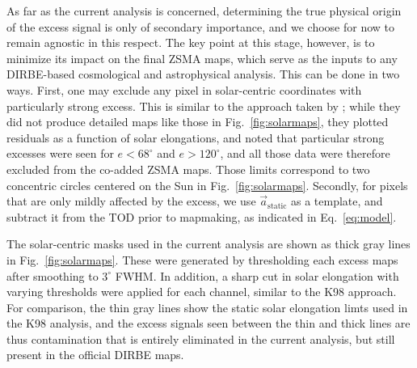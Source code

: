 \documentclass{aa}
\renewcommand{\a}[0]{\vec{a}}
\begin{document}
As far as the current analysis is concerned, determining the true
physical origin of the excess signal is only of secondary importance,
and we choose for now to remain agnostic in this respect. The key
point at this stage, however, is to minimize its impact on the final
ZSMA maps, which serve as the inputs to any DIRBE-based cosmological
and astrophysical analysis. This can be done in two ways. First, one
may exclude any pixel in solar-centric coordinates with particularly
strong excess. This is similar to the approach taken by
\citet{kelsall1998}; while they did not produce detailed maps like
those in Fig.~\ref{fig:solarmaps}, they plotted residuals as a
function of solar elongations, and noted that particular strong
excesses were seen for $e<68^{\circ}$ and $e>120^{\circ}$, and all
those data were therefore excluded from the co-added ZSMA maps. Those
limits correspond to two concentric circles centered on the Sun in
Fig.~\ref{fig:solarmaps}. Secondly, for pixels that are only mildly
affected by the excess, we use $\a_{\mathrm{static}}$ as a template, and
subtract it from the TOD prior to mapmaking, as indicated in
Eq.~\eqref{eq:model}. 


The solar-centric masks used in the current analysis are shown as
thick gray lines in Fig.~\ref{fig:solarmaps}. These were generated by
thresholding each excess maps after smoothing to $3^{\circ}$ FWHM. In
addition, a sharp cut in solar elongation with varying thresholds were
applied for each channel, similar to the K98 approach. For comparison,
the thin gray lines show the static solar elongation limts used in the
K98 analysis, and the excess signals seen between the thin and thick
lines are thus contamination that is entirely eliminated in the
current analysis, but still present in the official DIRBE maps.
\end{document}
